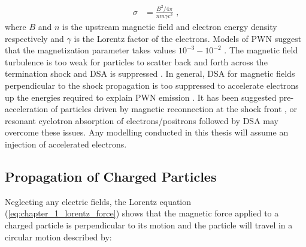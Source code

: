 \begin{equation}
    \begin{aligned}
        \sigma&=\frac{B^2/4\pi}{nm\gamma c^2}\text{ ,}
    \end{aligned}
\end{equation}
\noindent where $B$ and $n$ is the upstream magnetic field and electron energy density respectively and $\gamma$ is the Lorentz factor of the electrons. Models of PWN suggest that the magnetization parameter takes values $10^{-3}-10^{-2}$ \citep{1974MNRAS.167....1R,1984ApJ...283..694K,2004MNRAS.349..779K}. The magnetic field turbulence is too weak for particles to scatter back and forth across the termination shock and DSA is suppressed \citep{2010MNRAS.402..321L,2015SSRv..191..519S}. In general, DSA for magnetic fields perpendicular to the shock propagation is too suppressed to accelerate electrons up the energies required to explain PWN emission \citep{2003APh....19..649M, 2014ApJ...783...91C}.
\newpar
It has been suggested pre-acceleration of particles driven by magnetic reconnection at the shock front \citep{2001ApJ...547..437L,2003MNRAS.345..153L,2016JPlPh..82d6301L}, or resonant cyclotron absorption of electrons/positrons \cite{2001ApJ...547..437L}  followed by DSA may overcome these issues.
\newpar
Any modelling conducted in this thesis will assume an injection of accelerated electrons.

\subsection{Propagation of Charged Particles} \label{chapter_1_cr_propagation}

Neglecting any electric fields, the Lorentz equation (\autoref{eq:chapter_1_lorentz_force}) shows that the magnetic force applied to a charged particle is perpendicular to its motion and the particle will travel in a circular motion described by:

